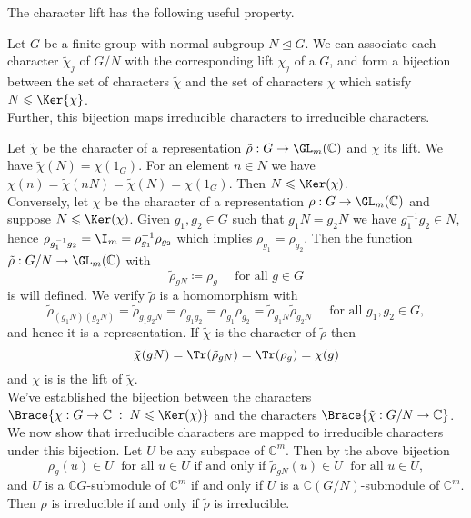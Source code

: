 \documentclass[../Project.tex]{subfiles}
\begin{document}
The character lift has the following useful property.
\begin{theo}[{\cite[Theorem 17.3]{2}}]
	Let $G$ be a finite group with normal subgroup $N \trianglelefteq G$. We can associate each character $\tilde{\chi}_j$ of $G/N$ with the corresponding lift $\chi_j$ of a $G$, and form a bijection between the set of characters $\tilde{\chi}$ and the set of characters $\chi$ which satisfy $N \leqslant \Ker{\chi}$.\\

	Further, this bijection maps irreducible characters to irreducible characters.
	\label{irredliftstoirred}
\end{theo}
\begin{proo*}[{\cite[Theorem 17.3]{2}}]
	Let $\tilde\chi$ be the character of a representation $\tilde\rho : G \to \GL_m(\mathbb{C})$ and $\chi$ its lift. We have $\tilde\chi(N) = \chi(1_G)$. For an element $n \in N$ we have $\chi(n) = \tilde\chi(nN) = \tilde\chi(N) = \chi(1_G)$. Then $N \leqslant \Ker(\chi)$.\\

	Conversely, let $\chi$ be the character of a representation $\rho : G \to \GL_m(\mathbb{C})$ and suppose $N \leqslant \Ker(\chi)$. Given $g_1,g_2 \in G$ such that $g_1N = g_2N$ we have $g_1^{-1}g_2 \in N$, hence $\rho_{g_1^{-1}g_2} = \I_m = \rho_{g_1}^{-1}\rho_{g_2}$ which implies $\rho_{g_1} = \rho_{g_2}$. Then the function $\tilde{\rho} : G/N \to \GL_m(\mathbb{C})$ with
	$$\tilde{\rho}_{gN} \coloneqq \rho_{g} \quad \text{ for all } g \in G$$
	is will defined. We verify $\tilde\rho$ is a homomorphism with
	$$\tilde{\rho}_{(g_1N)(g_2N)} = \tilde{\rho}_{g_1g_2N} = \rho_{g_1g_2} = \rho_{g_1}\rho_{g_2} = \tilde{\rho}_{g_1N}\tilde{\rho}_{g_2N} \quad\text{ for all } g_1,g_2\in G,$$
	and hence it is a representation. If $\tilde{\chi}$ is the character of $\tilde\rho$ then 
	$$\tilde\chi(gN) = \Tr(\tilde\rho_{gN}) = \Tr(\rho_g) = \chi(g)$$
	and $\chi$ is is the lift of $\tilde\chi$.\\

	We've established the bijection between the characters $\Brace{\chi : G \to \mathbb{C} \;:\;N \leqslant \Ker(\chi)}$ and the characters $\Brace{\tilde{\chi} : G/N \to \mathbb{C}}$.\\

	We now show that irreducible characters are mapped to irreducible characters under this bijection. Let $U$ be any subspace of $\mathbb{C}^m$. Then by the above bijection
	$$\rho_g(u) \in U\;\text{ for all } u \in U \text{ if and only if } \tilde\rho_{gN}(u) \in U\;\text{ for all } u \in U,$$
	and $U$ is a $\mathbb{C}G$-submodule of $\mathbb{C}^m$ if and only if $U$ is a $\mathbb{C}(G/N)$-submodule of $\mathbb{C}^m$. Then $\rho$ is irreducible if and only if $\tilde\rho$ is irreducible.\\
\end{proo*}
\end{document}
